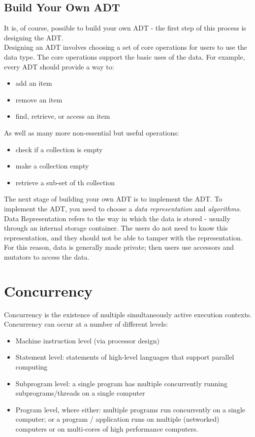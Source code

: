 \subsection{Build Your Own ADT}
It is, of course, possible to build your own ADT - the first step of this process is designing the ADT.\\

Designing an ADT involves choosing a set of core operations for users to use the data type. The core operations support the basic uses of the data. For example, every ADT should provide a way to:
\begin{itemize}
    \item add an item
    \item remove an item
    \item find, retrieve, or access an item
\end{itemize}
As well as many more non-essential but useful operations:
\begin{itemize}
    \item check if a collection is empty
    \item make a collection empty
    \item retrieve a sub-set of th collection
\end{itemize}

The next stage of building your own ADT is to implement the ADT. To implement the ADT, you need to choose a \textit{data representation} and \textit{algorithms}. Data Representation refers to the way in which the data is stored - usually through an internal storage container. The users do not need to know this representation, and they should not be able to tamper with the representation. For this reason, data is generally made private; then users use accessors and mutators to access the data. 

\section{Concurrency}
Concurrency is the existence of multiple simultaneously active execution contexts.\\

Concurrency can occur at a number of different levels:
\begin{itemize}
    \item Machine instruction level (via processor design)
    \item Statement level: statements of high-level languages that support parallel computing 
    \item Subprogram level: a single program has multiple concurrently running subprograms/threads on a single computer
    \item Program level, where either: multiple programs run concurrently on a single computer; or a program / application runs on multiple (networked) computers or on multi-cores of high performance computers.
\end{itemize}

